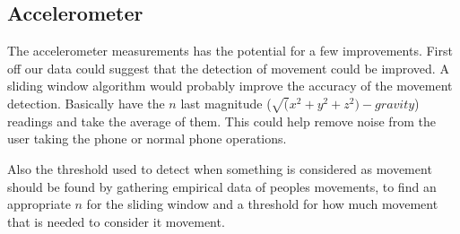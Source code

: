 \subsection{Accelerometer}
The accelerometer measurements has the potential for a few improvements. First off our data could suggest that the detection of movement could be improved. A sliding window algorithm would probably improve the accuracy of the movement detection. Basically have the $n$ last magnitude ($\sqrt(x^2+y^2+z^2)-gravity$) readings and take the average of them. This could help remove noise from the user taking the phone or normal phone operations.

Also the threshold used to detect when something is considered as movement should be found by gathering empirical data of peoples movements, to find an appropriate $n$ for the sliding window and a threshold for how much movement that is needed to consider it movement.